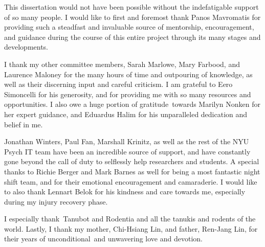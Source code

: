     
    
    

    
    This dissertation would not have been possible without the indefatigable
support of so many people. I would like to first and foremost thank
Panos Mavromatis for providing such a steadfast and invaluable source of
mentorship, encouragement, and guidance during the course of this entire
project through its many stages and developments.~

I thank my other committee members, Sarah Marlowe, Mary Farbood, and
Laurence Maloney for the many hours of time and outpouring of knowledge,
as well as their discerning input and careful criticism. I am grateful
to Eero Simoncelli for his generosity, and for providing me with so many
resources and opportunities. I also owe a huge portion of
gratitude~towards Marilyn Nonken for her expert guidance, and Eduardus
Halim for his unparalleled dedication and belief in me.

Jonathan Winters, Paul Fan, Marshall Krinitz, as well as the rest of the
NYU Psych IT team have been an incredible source of support, and have
constantly gone beyond the call of duty to selflessly help researchers
and students. A special thanks to Richie Berger and Mark Barnes as well
for being a most fantastic night shift team, and for their emotional
encouragement and camaraderie. I would like to also thank Lennart Belok
for his kindness and care towards me, especially during my injury
recovery phase.

I especially thank~Tanubot and Rodentia and all the tanukis and rodents
of the world. Lastly, I thank my mother, Chi-Hsiang Lin, and father,
Ren-Jang Lin, for their years of unconditional~and unwavering love and
devotion.



    
    
    
